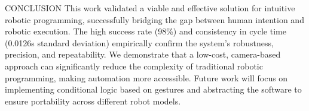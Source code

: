 \documentclass[%
  final,%
  english,%
  english,%
]{beamer}
\begin{document}
\begin{frame}[t, fragile = singleslide]
\begin{columns}[t, onlytextwidth]
%
\begin{column}{0.49\textwidth}
%
\begin{block}{CONCLUSION}
This work validated a viable and effective solution for intuitive robotic programming, successfully bridging the gap between human intention and robotic execution. The high success rate (98\%) and consistency in cycle time (0.0126s standard deviation) empirically confirm the system's robustness, precision, and repeatability. We demonstrate that a low-cost, camera-based approach can significantly reduce the complexity of traditional robotic programming, making automation more accessible. Future work will focus on implementing conditional logic based on gestures and abstracting the software to ensure portability across different robot models.


\end{block}
\end{column}
\end{columns}
\end{frame}
\end{document}
